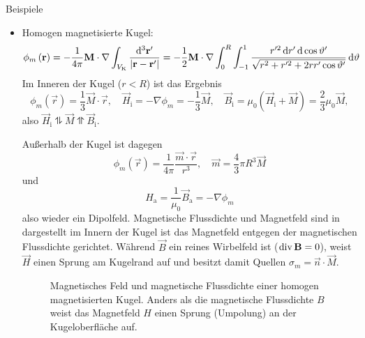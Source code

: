 Beispiele
\begin{itemize}
	\item Homogen magnetisierte Kugel:
	      \begin{equation*}
		      \phi _{m}\left(\vec {r}\right)=-\frac{1}{4\pi }\vec {M}\cdot \nabla \int _{V_{\mathrm{K}}}\frac{\diffa[3]{\vec{r}'}}{\left| \vec {r}-\vec {r}'\right| }=-\frac{1}{2}\vec {M}\cdot \nabla \int _{0}^{R}\int _{-1}^{1}\frac{r'^{2}\diff r'\diff \cos \vartheta '}{\sqrt{r^{2}+r'^{2}+2rr'\cos \vartheta '}}\diff \vartheta
	      \end{equation*}
	      Im Inneren der Kugel ($r<R$) ist das Ergebnis
	      \begin{equation*}
		      \phi _{m}\left(\vec {r}\right)=\frac{1}{3}\vec {M}\cdot \vec {r}, \quad\vec {H}_{\mathrm{i}}=-\nabla \phi _{m}=-\frac{1}{3}\vec {M},\quad \vec {B}_{\mathrm{i}}=\mu _{0}\left(\vec {H}_{\mathrm{i}}+\vec {M}\right)=\frac{2}{3}\mu _{0}\vec {M},
	      \end{equation*}
	      also $\vec {H}_{\mathrm{i}}\updownharpoons \vec {M}\upupharpoons \vec {B}_{\mathrm{i}}$.

	      Außerhalb der Kugel ist dagegen
	      \begin{equation*}
		      \phi _{m}\left(\vec {r}\right)=\frac{1}{4\pi }\frac{\vec {m}\cdot \vec {r}}{r^{3}},\quad \vec {m}=\frac{4}{3}\pi R^{3}\vec {M}
	      \end{equation*}
	      und
	      \begin{equation*}
		      H_{\mathrm{a}}=\frac{1}{\mu _{0}}\vec {B}_{\mathrm{a}}=-\nabla \phi _{m}
	      \end{equation*}
	      also wieder ein Dipolfeld. Magnetische Flussdichte und Magnetfeld sind in  dargestellt \textendash{} im Innern der Kugel ist das Magnetfeld entgegen der magnetischen Flussdichte gerichtet. Während $\vec {B}$ ein reines Wirbelfeld ist ($\divg \vec {B}=0$), weist $\vec {H}$ einen Sprung am Kugelrand auf und besitzt damit Quellen $\sigma _{m}=\vec {n}\cdot \vec {M}$.

	      \begin{figure}[htb]
		      \centering
		      \tfigMagneticFieldHomogenousBall
		      \caption{Magnetisches Feld und magnetische Flussdichte einer homogen magnetisierten Kugel. Anders als die magnetische Flussdichte $B$ weist das Magnetfeld $H$ einen Sprung (Umpolung) an der Kugeloberfläche auf.  }
		      \label{fig:magnetic_field_homogenously_magnetized_ball}
	      \end{figure}


\end{itemize}
